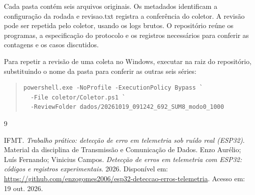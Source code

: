 \documentclass[12pt,a4paper]{article}
\begin{document}
Cada pasta contém seis arquivos originais. Os metadados identificam a configuração da rodada e revisao.txt registra a conferência do coletor. A revisão pode ser repetida pelo coletor, usando os logs brutos. O repositório reúne os programas, a especificação do protocolo e os registros necessários para conferir as contagens e os casos discutidos.\par

Para repetir a revisão de uma coleta no Windows, executar na raiz do repositório, substituindo o nome da pasta para conferir as outras seis séries:\par

\begin{quote}\begin{minipage}{\linewidth}\begin{singlespace}\small\begin{verbatim}
powershell.exe -NoProfile -ExecutionPolicy Bypass `
  -File coletor/Coletor.ps1 `
  -ReviewFolder dados/20261019_091242_692_SUM8_modo0_1000
\end{verbatim}\end{singlespace}\end{minipage}\end{quote}

\clearpage
\begin{thebibliography}{9}
 IFMT. \textit{Trabalho prático: detecção de erro em telemetria sob ruído real (ESP32)}. Material da disciplina de Transmissão e Comunicação de Dados.
 Enzo Aurélio; Luís Fernando; Vinicius Campos. \textit{Detecção de erros em telemetria com ESP32: códigos e registros experimentais}. 2026. Disponível em: \url{https://github.com/enzogomes2006/esp32-deteccao-erros-telemetria}. Acesso em: 19 out. 2026.
\end{thebibliography}
\end{document}
